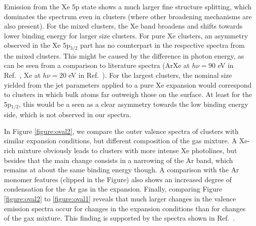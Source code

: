 Emission from the Xe 5p state shows a much larger fine structure splitting, which dominates the spectrum even in clusters (where other broadening mechanisms are also present). 
For the mixed clusters, the Xe band broadens and shifts towards lower binding energy for larger size clusters. 
For pure Xe clusters, an asymmetry observed in the Xe 5p$_{3/2}$ part has no counterpart in the respective spectra from the mixed clusters.
This might be caused by the difference in photon energy, as can be seen from a comparison to literature spectra (ArXe at $h\nu = 90$ eV in Ref.\ , Xe at $h\nu = 20$ eV in Ref.\ ).
For the largest clusters, the nominal size yielded from the jet parameters applied to a pure Xe expansion would correspond to clusters in which bulk atoms far outweigh those on the surface.
At least for the 5p$_{1/2}$, this would be a seen as a clear asymmetry towards the low binding energy side, which is not observed in our spectra.

In Figure \ref{figure:oval2}, we compare the outer valence spectra of clusters with similar expansion conditions, but different composition of the gas mixture.
A Xe-rich mixture obviously leads to clusters with more intense Xe photolines, but besides that the main change consists in a narrowing of the Ar band, which remains at about the same binding energy though.
A comparison with the Ar monomer features (clipped in the Figure) also shows an increased degree of condensation for the Ar gas in the expansion.
Finally, comparing Figure \ref{figure:oval2} to \ref{figure:oval1} reveals that much larger changes in the valence emission spectra occur for changes in the expansion conditions than for changes of the gax mixture.
This finding is supported by the spectra shown in Ref.\ .
%
%
